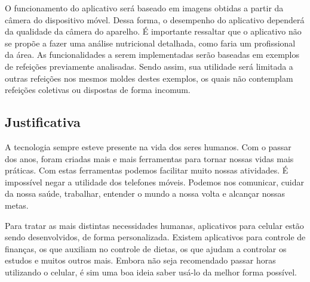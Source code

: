 O funcionamento do aplicativo será baseado em imagens obtidas a partir da câmera do dispositivo móvel. Dessa forma, o desempenho do aplicativo dependerá da qualidade da câmera do aparelho. É importante ressaltar que o aplicativo não se propõe a fazer uma análise nutricional detalhada, como faria um profissional da área. As funcionalidades a serem implementadas serão baseadas em exemplos de refeições previamente analisadas. Sendo assim, sua utilidade será limitada a outras refeições nos mesmos moldes destes exemplos, os quais não contemplam refeições coletivas ou dispostas de forma incomum.


\subsection{Justificativa}

A tecnologia sempre esteve presente na vida dos seres humanos. Com o passar dos anos, foram criadas mais e mais ferramentas para tornar nossas vidas mais práticas. Com estas ferramentas podemos facilitar muito nossas atividades. É impossível negar a utilidade dos telefones móveis. Podemos nos comunicar, cuidar da nossa saúde, trabalhar, entender o mundo a nossa volta e alcançar nossas metas.%

Para tratar as mais distintas necessidades humanas, aplicativos para celular estão sendo desenvolvidos, de forma personalizada. Existem aplicativos para controle de finanças, os que auxiliam no controle de dietas, os que ajudam a controlar os estudos e muitos outros mais. Embora não seja recomendado passar horas utilizando o celular, é sim uma boa ideia saber usá-lo da melhor forma possível.

